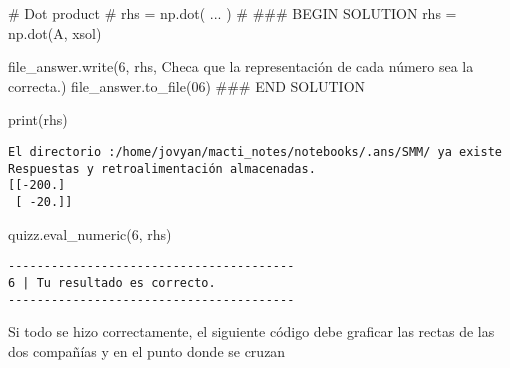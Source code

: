 \documentclass[
  letterpaper,
  DIV=11,
  numbers=noendperiod]{scrreprt}
\newenvironment{Shaded}{\begin{snugshade}}{\end{snugshade}}
\newcommand{\BuiltInTok}[1]{\textcolor[rgb]{0.00,0.23,0.31}{#1}}
\newcommand{\CommentTok}[1]{\textcolor[rgb]{0.37,0.37,0.37}{#1}}
\newcommand{\NormalTok}[1]{\textcolor[rgb]{0.00,0.23,0.31}{#1}}
\newcommand{\OperatorTok}[1]{\textcolor[rgb]{0.37,0.37,0.37}{#1}}
\newcommand{\RegionMarkerTok}[1]{\textcolor[rgb]{0.00,0.23,0.31}{#1}}
\newcommand{\StringTok}[1]{\textcolor[rgb]{0.13,0.47,0.30}{#1}}
\begin{document}
\begin{Shaded}
\begin{Highlighting}[]
\CommentTok{\# Dot product}
\CommentTok{\# rhs = np.dot( ... )}
\CommentTok{\#}
\CommentTok{\#\#\# }\RegionMarkerTok{BEGIN}\CommentTok{ SOLUTION}
\NormalTok{rhs }\OperatorTok{=}\NormalTok{ np.dot(A, xsol)}

\NormalTok{file\_answer.write(}\StringTok{\textquotesingle{}6\textquotesingle{}}\NormalTok{, rhs, }\StringTok{\textquotesingle{}Checa que la representación de cada número sea la correcta.\textquotesingle{}}\NormalTok{)}
\NormalTok{file\_answer.to\_file(}\StringTok{\textquotesingle{}06\textquotesingle{}}\NormalTok{)}
\CommentTok{\#\#\# }\RegionMarkerTok{END}\CommentTok{ SOLUTION}

\BuiltInTok{print}\NormalTok{(rhs)}
\end{Highlighting}
\end{Shaded}

\begin{verbatim}
El directorio :/home/jovyan/macti_notes/notebooks/.ans/SMM/ ya existe
Respuestas y retroalimentación almacenadas.
[[-200.]
 [ -20.]]
\end{verbatim}

\begin{Shaded}
\begin{Highlighting}[]
\NormalTok{quizz.eval\_numeric(}\StringTok{\textquotesingle{}6\textquotesingle{}}\NormalTok{, rhs)}
\end{Highlighting}
\end{Shaded}

\begin{verbatim}
----------------------------------------
6 | Tu resultado es correcto.
----------------------------------------
\end{verbatim}

Si todo se hizo correctamente, el siguiente código debe graficar las
rectas de las dos compañías y en el punto donde se cruzan
\end{document}
